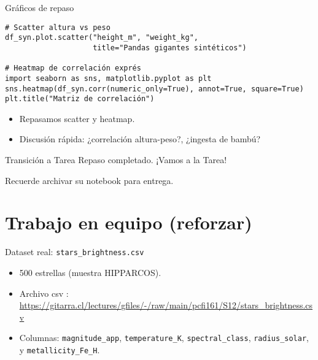 \documentclass[10pt]{beamer}
\begin{document}
\begin{frame}[fragile]{Gráficos de repaso}
\begin{verbatim}
# Scatter altura vs peso
df_syn.plot.scatter("height_m", "weight_kg",
                    title="Pandas gigantes sintéticos")

# Heatmap de correlación exprés
import seaborn as sns, matplotlib.pyplot as plt
sns.heatmap(df_syn.corr(numeric_only=True), annot=True, square=True)
plt.title("Matriz de correlación")
\end{verbatim}

\begin{itemize}
  \item Repasamos scatter y heatmap.
  \item Discusión rápida: ¿correlación altura-peso?, ¿ingesta de bambú?
\end{itemize}
\end{frame}

\begin{frame}{Transición a Tarea}
\Large
Repaso completado. ¡Vamos a la Tarea!
\vspace{0.4cm}

\small
Recuerde archivar su notebook para entrega.
\end{frame}

\section{Trabajo en equipo (reforzar)}

\begin{frame}{Dataset real: \texttt{stars\_brightness.csv}}
\begin{itemize}
  \item 500 estrellas (muestra HIPPARCOS).
  \item Archivo csv : \url{https://gitarra.cl/lectures/gfiles/-/raw/main/pcfi161/S12/stars_brightness.csv}
  \item Columnas: \texttt{magnitude\_app}, \texttt{temperature\_K},
        \texttt{spectral\_class}, \texttt{radius\_solar}, y \texttt{metallicity\_Fe\_H}.
\end{itemize}
\end{frame}
\end{document}
